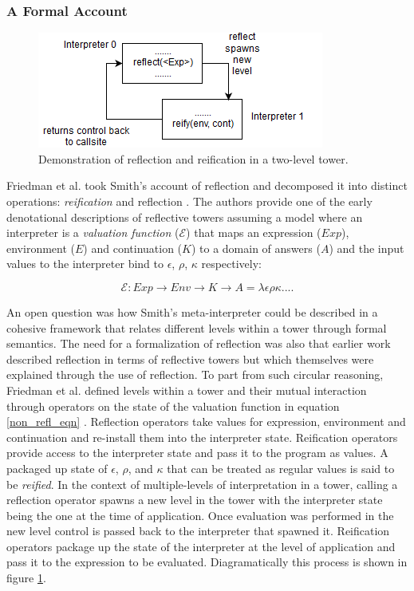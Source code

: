 \documentclass{article}
\theoremstyle{definition}
\begin{document}
\subsubsection{A Formal Account}
\begin{figure}[t]
	\centering
	\includegraphics{refl_reif_tower.png}
	\caption{Demonstration of reflection and reification in a two-level tower.}\label{refl_reif_tower}
\end{figure}

Friedman et al. took Smith's account of reflection and decomposed it into distinct operations: \textit{reification} and reflection \cite{friedman1984reification, wand1988mystery}. The authors provide one of the early denotational descriptions of reflective towers assuming a model where an interpreter is a \textit{valuation function} ($\mathcal{E}$) that maps an expression ($Exp$), environment ($E$) and continuation ($K$) to a domain of answers ($A$) and the input values to the interpreter bind to $\epsilon$, $\rho$, $\kappa$ respectively:

\begin{equation}\label{non_refl_eqn}
\mathcal{E}: Exp \rightarrow Env \rightarrow K \rightarrow A = \lambda\epsilon\rho\kappa....
\end{equation}

An open question was how Smith's meta-interpreter \cite{smith1982reflection} could be described in a cohesive framework that relates different levels within a tower through formal semantics. The need for a formalization of reflection was also that earlier work described reflection in terms of reflective towers but which themselves were explained through the use of reflection. To part from such circular reasoning, Friedman et al. defined levels within a tower and their mutual interaction through operators on the state of the valuation function in equation \ref{non_refl_eqn} \cite{friedman1984reification}. Reflection operators take values for expression, environment and continuation and re-install them into the interpreter state. Reification operators provide access to the interpreter state and pass it to the program as values. A packaged up state of $\epsilon$, $\rho$, and $\kappa$ that can be treated as regular values is said to be \textit{reified}. In the context of multiple-levels of interpretation in a tower, calling a reflection operator spawns a new level in the tower with the interpreter state being the one at the time of application. Once evaluation was performed in the new level control is passed back to the interpreter that spawned it. Reification operators package up the state of the interpreter at the level of application and pass it to the expression to be evaluated. Diagramatically this process is shown in figure \ref{refl_reif_tower}.
\end{document}
